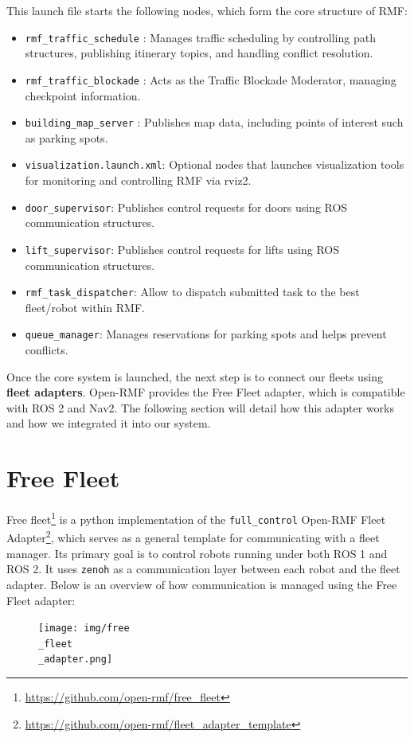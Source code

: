 This launch file starts the following nodes, which form the core structure of RMF:
\begin{itemize}
	\item \texttt{rmf\_traffic\_schedule} : Manages traffic scheduling by controlling path structures, publishing itinerary topics, and handling conflict resolution.
	\item \texttt{rmf\_traffic\_blockade} : Acts as the Traffic Blockade Moderator, managing checkpoint information.
	\item \texttt{building\_map\_server} : Publishes map data, including points of interest such as parking spots.
	\item \texttt{visualization.launch.xml}: Optional nodes that launches visualization tools for monitoring and controlling RMF via rviz2.
	\item \texttt{door\_supervisor}: Publishes control requests for doors using ROS communication structures.
	\item \texttt{lift\_supervisor}: Publishes control requests for lifts using ROS communication structures.
	\item \texttt{rmf\_task\_dispatcher}: Allow to dispatch submitted task to the best fleet/robot within RMF.
	\item \texttt{queue\_manager}: Manages reservations for parking spots and helps prevent conflicts.
\end{itemize}

Once the core system is launched, the next step is to connect our fleets using \textbf{fleet adapters}. Open-RMF provides the Free Fleet adapter, which is compatible with ROS 2 and Nav2. The following section will detail how this adapter works and how we integrated it into our system.

\section{Free Fleet}
Free fleet\footnote{\href{https://github.com/open-rmf/free\_fleet}{https://github.com/open-rmf/free\_fleet}} is a python implementation of the \texttt{full\_control} Open-RMF Fleet Adapter\footnote{\href{https://github.com/open-rmf/fleet_adapter_template}{https://github.com/open-rmf/fleet\_adapter\_template}}, which serves as a general template for communicating with a fleet manager. Its primary goal is to control robots running under both ROS 1 and ROS 2.
It uses \texttt{zenoh} as a communication layer between each robot and the fleet adapter.
Below is an overview of how communication is managed using the Free Fleet adapter:
\begin{figure}[h]
	\centering
	\texttt{[image: img/free\\\_fleet\\\_adapter.png]}
\end{figure}
